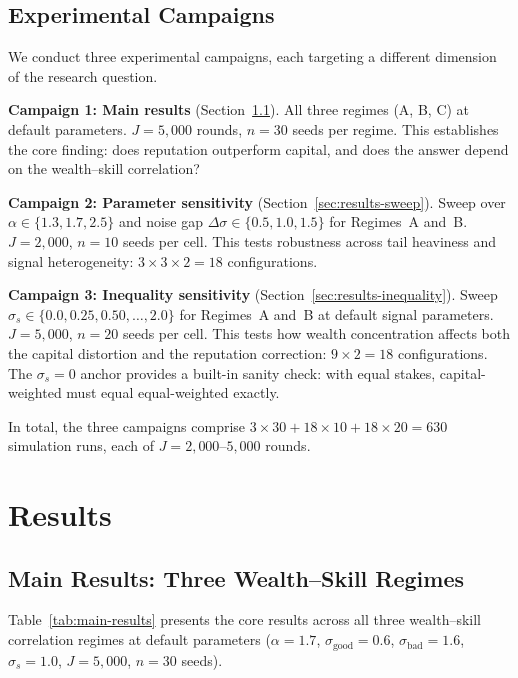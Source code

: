 \documentclass[conference]{IEEEtran}
\begin{document}
\subsection{Experimental Campaigns}
\label{sec:experiments-campaigns}

We conduct three experimental campaigns, each targeting a different dimension of the research question.

\textbf{Campaign 1: Main results} (Section~\ref{sec:results-main}). All three regimes (A, B, C) at default parameters. $J = 5{,}000$ rounds, $n = 30$ seeds per regime. This establishes the core finding: does reputation outperform capital, and does the answer depend on the wealth--skill correlation?

\textbf{Campaign 2: Parameter sensitivity} (Section~\ref{sec:results-sweep}). Sweep over $\alpha \in \{1.3, 1.7, 2.5\}$ and noise gap $\Delta\sigma \in \{0.5, 1.0, 1.5\}$ for Regimes~A and~B. $J = 2{,}000$, $n = 10$ seeds per cell. This tests robustness across tail heaviness and signal heterogeneity: $3 \times 3 \times 2 = 18$ configurations.

\textbf{Campaign 3: Inequality sensitivity} (Section~\ref{sec:results-inequality}). Sweep $\sigma_s \in \{0.0, 0.25, 0.50, \dots, 2.0\}$ for Regimes~A and~B at default signal parameters. $J = 5{,}000$, $n = 20$ seeds per cell. This tests how wealth concentration affects both the capital distortion and the reputation correction: $9 \times 2 = 18$ configurations. The $\sigma_s = 0$ anchor provides a built-in sanity check: with equal stakes, capital-weighted must equal equal-weighted exactly.

In total, the three campaigns comprise $3 \times 30 + 18 \times 10 + 18 \times 20 = 630$ simulation runs, each of $J = 2{,}000$--$5{,}000$ rounds.

\section{Results}
\label{sec:results}

\subsection{Main Results: Three Wealth--Skill Regimes}
\label{sec:results-main}

Table~\ref{tab:main-results} presents the core results across all three wealth--skill correlation regimes at default parameters ($\alpha = 1.7$, $\sigma_{\text{good}} = 0.6$, $\sigma_{\text{bad}} = 1.6$, $\sigma_s = 1.0$, $J = 5{,}000$, $n = 30$ seeds).
\end{document}
